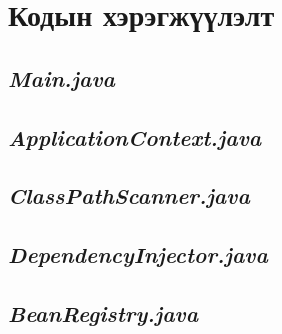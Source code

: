 \appendix
\clearpage
\markboth{}{}
\pagestyle{fancy}



\chapter{Кодын хэрэгжүүлэлт}

\section{\textit{\textbf{Main.java}}}


\clearpage
\section{\textit{\textbf{ApplicationContext.java}}}


\clearpage
\section{\textit{\textbf{ClassPathScanner.java}}}


\clearpage
\section{\textit{\textbf{DependencyInjector.java}}}


\clearpage
\section{\textit{\textbf{BeanRegistry.java}}}


